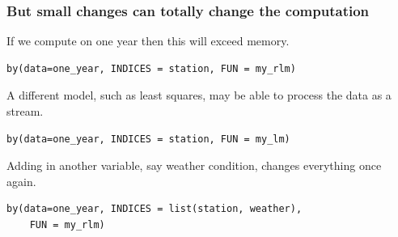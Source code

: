\documentclass{beamer}
\begin{document}
\begin{frame}[fragile]

    \frametitle{But small changes can totally change the
    computation}

    If we compute on one year then this will exceed memory.

\begin{verbatim}
by(data=one_year, INDICES = station, FUN = my_rlm)
\end{verbatim}

\pause 

    A different model, such as least squares, may be able to process the
    data as a stream.

\begin{verbatim}
by(data=one_year, INDICES = station, FUN = my_lm)
\end{verbatim}

\pause 

    Adding in another variable, say weather condition, changes everything
    once again.

\begin{verbatim}
by(data=one_year, INDICES = list(station, weather),
    FUN = my_rlm)
\end{verbatim}

%
%

\end{frame}
\end{document}
